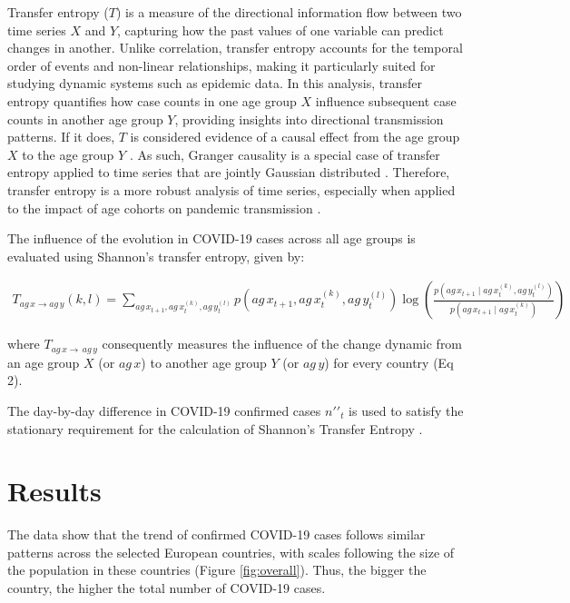 \documentclass[]{interact}
\theoremstyle{plain}%
\theoremstyle{definition}
\theoremstyle{remark}
\begin{document}
Transfer entropy (\(T\)) is a measure of the directional information flow between two time series \(X\) and \(Y\), capturing how the past values of one variable can predict changes in another. Unlike correlation, transfer entropy accounts for the temporal order of events and non-linear relationships, making it particularly suited for studying dynamic systems such as epidemic data. In this analysis, transfer entropy quantifies how case counts in one age group \(X\) influence subsequent case counts in another age group \(Y\), providing insights into directional transmission patterns. If it does, \(T\) is considered evidence of a causal effect from the age group \(X\) to the age group \(Y\) \citep{schreiber2000measuring}. As such, Granger causality is a special case of transfer entropy applied to time series that are jointly Gaussian distributed \citep{barnett2009granger}. Therefore, transfer entropy is a more robust analysis of time series, especially when applied to the impact of age cohorts on pandemic transmission \citep{kissler2020symbolic}.

The influence of the evolution in COVID-19 cases across all age groups is evaluated using Shannon's transfer entropy, given by:

\begin{align}
  \tag{2}
  T_{ag\,x \rightarrow ag\,y}(k,l) = \sum_{ag\,x_{t+1}, ag\,x_t^{(k)}, ag\,y_t^{(l)}} 
  p\left(ag\,x_{t+1}, ag\,x_t^{(k)}, ag\,y_t^{(l)}\right) 
  \log \left(\frac{p\left(ag\,x_{t+1} \mid ag\,x_t^{(k)}, ag\,y_t^{(l)}\right)}{p\left(ag\,x_{t+1} \mid ag\,x_t^{(k)}\right)}\right)
\end{align}

\noindent where \(T_{ag\,x \rightarrow\,ag\,y}\) consequently measures the influence of the change dynamic from an age group \(X\) (or \(ag\,x\)) to another age group \(Y\) (or \(ag\,y\)) for every country (Eq 2).

The day-by-day difference in COVID-19 confirmed cases \(n\prime\prime_t\) is used to satisfy the stationary requirement for the calculation of Shannon's Transfer Entropy \citep{shannon1948mathematical, behrendt2019rtransferentropy}.

\section{Results}\label{results}

The data show that the trend of confirmed COVID-19 cases follows similar patterns across the selected European countries, with scales following the size of the population in these countries (Figure \ref{fig:overall}). Thus, the bigger the country, the higher the total number of COVID-19 cases.
\end{document}
